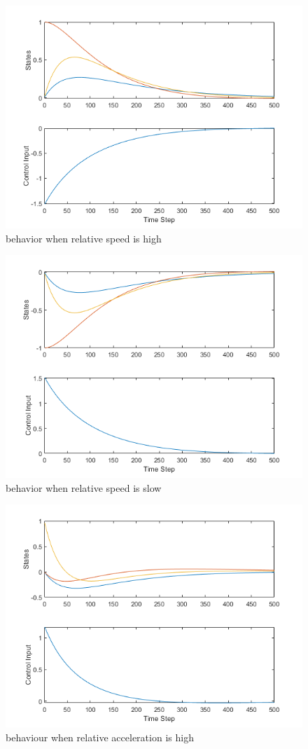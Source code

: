\documentclass[12pt]{report}
\begin{document}
\begin{figure}
    \centering
    \includegraphics[width = 0.8 \textwidth]{hiz.png}
    \caption{behavior when relative speed is high}
\end{figure}

\begin{figure}
    \centering
    \includegraphics[width = 0.8 \textwidth]{slow.png}
    \caption{behavior when relative speed is slow}
\end{figure}

\begin{figure}
    \centering
    \includegraphics[width = 0.8 \textwidth]{accelerated.png}
    \caption{behaviour when relative acceleration is high}
\end{figure}
\end{document}
